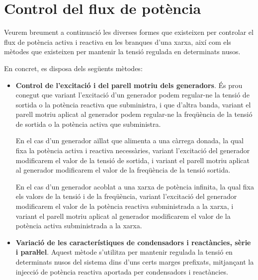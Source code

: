\section{Control del flux de potència} \label{sec:control-flux-pot}

Veurem breument a continuació les diverses formes que existeixen
per controlar el flux de potència activa i reactiva en les branques
d'una xarxa, així com els mètodes que existeixen per mantenir la
tensió regulada en determinats nusos.

En concret, es disposa dels següents mètodes:

\begin{itemize}
 \item \textbf{Control de l'excitació i del parell motriu dels generadors}. És prou conegut
    que variant l'excitació d'un generador podem regular-ne la tensió de sortida o
        la potència reactiva que subministra, i que d'altra banda, variant el parell motriu aplicat al generador
    podem regular-ne la freqüència de la  tensió de sortida o la potència activa que subministra.

    En el cas d'un generador aïllat que alimenta a una càrrega
    donada, la qual fixa la potència activa i reactiva necessàries, variant
     l'excitació del generador modificarem el valor de la tensió de sortida, i variant el parell motriu aplicat al generador modificarem el valor de la freqüència de la tensió sortida.

     En el cas d'un generador acoblat a una xarxa de potència
    infinita, la qual fixa els valors de la tensió i de la freqüència, variant l'excitació del generador modificarem el valor de la potència reactiva subministrada a la xarxa, i variant el parell motriu aplicat al     generador modificarem el valor de la potència
    activa  subministrada a la xarxa.

   \item \textbf{Variació de les característiques de condensadors i reactàncies, sèrie
    i paraŀlel}. Aquest mètode s'utilitza per mantenir regulada la tensió en determinats
     nusos del sistema dins d'uns certs marges prefixats, mitjançant la injecció  de potència
      reactiva aportada per condensadors i reactàncies.


\end{itemize}

